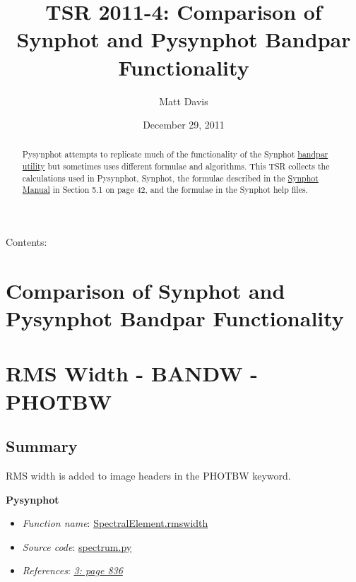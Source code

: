 \documentclass[letterpaper,10pt,english]{sphinxtsr}
\title{TSR 2011-4: Comparison of Synphot and Pysynphot Bandpar Functionality}
\date{December 29, 2011}
\author{Matt Davis}
\begin{document}
\maketitle
\tableofcontents
{}\label{index::doc}


Contents:


\chapter{Comparison of Synphot and Pysynphot Bandpar Functionality}
\label{main:comparison-of-synphot-and-pysynphot-bandpar-functionality}\label{main:tsr-2011-4-comparison-of-synphot-and-pysynphot-bandpar-functionality}\label{main::doc}
\begin{abstract}

Pysynphot attempts to replicate much of the functionality of the Synphot
\href{https://svn.stsci.edu/trac/ssb/stsci\_python/browser/stsdas/trunk/stsdas/pkg/hst\_calib/synphot/doc/bandpar.hlp}{bandpar utility}
but sometimes uses different formulae and algorithms.
This TSR collects the calculations used in Pysynphot, Synphot, the
formulae described in the \href{http://stsdas.stsci.edu/stsci\_python\_epydoc/SynphotManual.pdf}{Synphot Manual} in Section 5.1 on page 42,
and the formulae in the Synphot help files.

\end{abstract}


\chapter{RMS Width - BANDW - PHOTBW}
\label{main:synphot-manual}\label{main:rms-width-bandw-photbw}

\section{Summary}
\label{main:summary}
RMS width is added to image headers in the PHOTBW keyword.

\textbf{Pysynphot}
\begin{itemize}
\item {} 
\emph{Function name}: \href{https://trac.assembla.com/astrolib/browser/trunk/pysynphot/lib/pysynphot/spectrum.py\#L1083}{SpectralElement.rmswidth}

\item {} 
\emph{Source code}: \href{https://trac.assembla.com/astrolib/browser/trunk/pysynphot/lib/pysynphot/spectrum.py}{spectrum.py}

\item {} 
\emph{References}: {\hyperref[references:ref3]{\emph{3: page 836}}}

\end{itemize}
\end{document}
